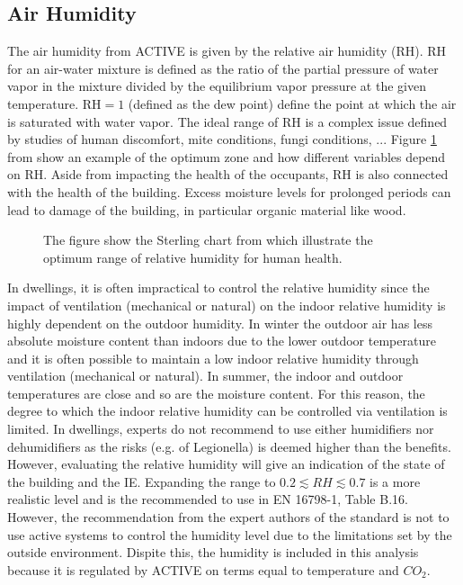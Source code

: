 \documentclass[fleqn,usenatbib,nofootinbib]{revtex4-2}
\begin{document}
	\subsection{Air Humidity}
	The air humidity from ACTIVE is given by the relative air humidity (RH). RH for an air-water mixture is defined as the ratio of the partial pressure of water vapor in the mixture divided by the equilibrium vapor pressure at the given temperature. $\text{RH}=1$ (defined as the dew point) define the point at which the air is saturated with water vapor. The ideal range of RH is a complex issue defined by studies of human discomfort, mite conditions, fungi conditions, ... Figure \ref{fig:ster} from \citet{sterling1985} show an example of the optimum zone and how different variables depend on RH. Aside from impacting the health of the occupants, RH is also connected with the health of the building. Excess moisture levels for prolonged periods can lead to damage of the building, in particular organic material like wood.
	\begin{figure}[h]
		\caption{\label{fig:ster} The figure show the Sterling chart from \citet{sterling1985} which illustrate the optimum range of relative humidity for human health.}
	\end{figure}
	In dwellings, it is often impractical to control the relative humidity since the impact of ventilation (mechanical or natural) on the indoor relative humidity is highly dependent on the outdoor humidity. In winter the outdoor air has less absolute moisture content than indoors due to the lower outdoor temperature and it is often possible to maintain a low indoor relative humidity through ventilation (mechanical or natural). In summer, the indoor and outdoor temperatures are close and so are the moisture content. For this reason, the degree to which the indoor relative humidity can be controlled via ventilation is limited. In dwellings, experts do not recommend to use either humidifiers nor dehumidifiers as the risks (e.g. of Legionella) is deemed higher than the benefits. However, evaluating the relative humidity will give an indication of the state of the building and the IE. Expanding the range to $0.2\lesssim RH\lesssim 0.7$ is a more realistic level and is the recommended to use in EN 16798-1, Table B.16. However, the recommendation from the expert authors of the standard is not to use active systems to control the humidity level due to the limitations set by the outside environment. Dispite this, the humidity is included in this analysis because it is regulated by ACTIVE on terms equal to temperature and $CO_2$.
	
\end{document}
